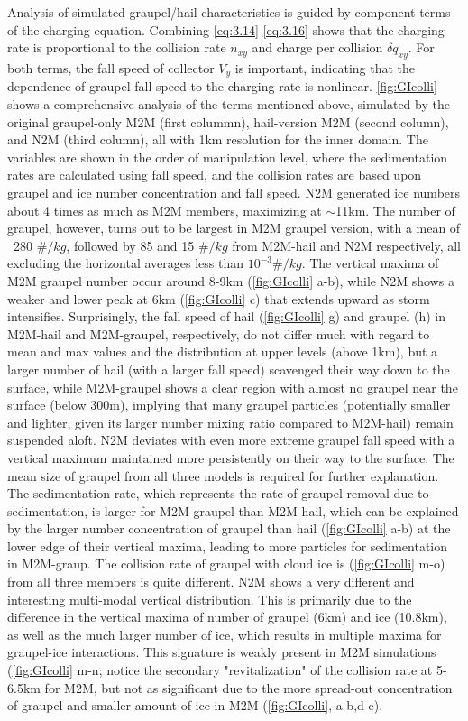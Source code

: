 Analysis of simulated graupel/hail characteristics is guided by component terms of the charging equation. Combining \ref{eq:3.14}-\ref{eq:3.16} shows that the charging rate is proportional to the collision rate $n_{xy}$ and charge per collision $\delta q_{xy}$. For both terms, the fall speed of collector $V_y$ is important, indicating that the dependence of graupel fall speed to the charging rate is nonlinear. \ref{fig:GIcolli} shows a comprehensive analysis of the terms mentioned above, simulated by the original graupel-only M2M (first colummn), hail-version M2M (second column), and N2M (third column), all with 1km resolution for the inner domain. The variables are shown in the order of manipulation level, where the sedimentation rates are calculated using fall speed, and the collision rates are based upon graupel and ice number concentration and fall speed. N2M generated ice numbers about 4 times as much as M2M members, maximizing at $\sim$11km. The number of graupel, however, turns out to be largest in M2M graupel version, with a mean of ~280 $\#/kg$, followed by 85 and 15 $\#/kg$ from M2M-hail and N2M respectively, all excluding the horizontal averages less than $10^{-3} \#/kg$. The vertical maxima of M2M graupel number occur around 8-9km (\ref{fig:GIcolli} a-b), while N2M shows a weaker and lower peak at 6km (\ref{fig:GIcolli} c) that extends upward as storm intensifies. Surprisingly, the fall speed of hail (\ref{fig:GIcolli} g) and graupel (h) in M2M-hail and M2M-graupel, respectively, do not differ much with regard to mean and max values and the distribution at upper levels (above 1km), but a larger number of hail (with a larger fall speed) scavenged their way down to the surface, while M2M-graupel shows a clear region with almost no graupel near the surface (below 300m), implying that many graupel particles (potentially smaller and lighter, given its larger number mixing ratio compared to M2M-hail) remain suspended aloft. N2M deviates with even more extreme graupel fall speed with a vertical maximum maintained more persistently on their way to the surface. The mean size of graupel from all three models is required for further explanation. The sedimentation rate, which represents the rate of graupel removal due to sedimentation, is larger for M2M-graupel than M2M-hail, which can be explained by the larger number concentration of graupel than hail (\ref{fig:GIcolli} a-b) at the lower edge of their vertical maxima, leading to more particles for sedimentation in M2M-graup. The collision rate of graupel with cloud ice is (\ref{fig:GIcolli} m-o) from all three members is quite different. N2M shows a very different and interesting multi-modal vertical distribution. This is primarily due to the difference in the vertical maxima of number of graupel (6km) and ice (10.8km), as well as the much larger number of ice, which results in multiple maxima for graupel-ice interactions. This signature is weakly present in M2M simulations (\ref{fig:GIcolli} m-n; notice the secondary "revitalization" of the collision rate at 5-6.5km for M2M, but not as significant due to the more spread-out concentration of graupel and smaller amount of ice in M2M (\ref{fig:GIcolli}, a-b,d-e). 